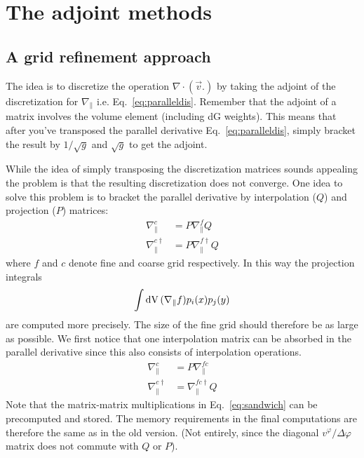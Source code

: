 \section{The adjoint methods}
\subsection{A grid refinement approach}
The idea is to discretize the operation $\nabla\cdot( \vec v .)$ by
taking the adjoint of the discretization for $\nabla_\parallel$ i.e. Eq.~\eqref{eq:paralleldis}.
Remember that the adjoint of a matrix
involves the volume element (including dG weights). This means that after you've transposed the
parallel derivative Eq.~\eqref{eq:paralleldis}, simply bracket the result
by $1/\sqrt{g}$ and $\sqrt{g}$ to get the adjoint.

While the idea of simply transposing the discretization matrices sounds appealing the problem
is that the resulting discretization does not converge.
One idea to solve this problem \cite{Stegmeir2017} is
to bracket the parallel derivative by interpolation ($Q$) and
projection ($P$) matrices:
\begin{align}
    \nabla^c_\parallel &= P\nabla_\parallel^f Q \\
    \nabla^{c\dagger}_\parallel &= P \nabla^{f\dagger}_\parallel Q
    \label{eq:sandwich}
\end{align}
where $f$ and $c$ denote fine and coarse grid respectively.
In this way the projection integrals
\begin{align*}
    \int\mathrm{dV}\, (\nabla_\parallel f) p_i(x)p_j(y)
    \label{}
\end{align*}
are computed more precisely.
The size of the fine grid should therefore be as large as
possible.
We first notice that one interpolation matrix can be absorbed
in the parallel derivative since this also consists of
interpolation operations.
\begin{align}
    \nabla^c_\parallel &= P\nabla_\parallel^{fc} \\
    \nabla^{c\dagger}_\parallel &= \nabla^{fc\dagger}_\parallel Q
    \label{eq:sandwich}
\end{align}
Note that the matrix-matrix multiplications in Eq.~\eqref{eq:sandwich} can
be precomputed and stored. The memory requirements
in the final computations are
therefore the same  as in the old version. (Not entirely, since
the diagonal $v^\varphi/\Delta \varphi$ matrix does not commute with $Q$ or $P$).




